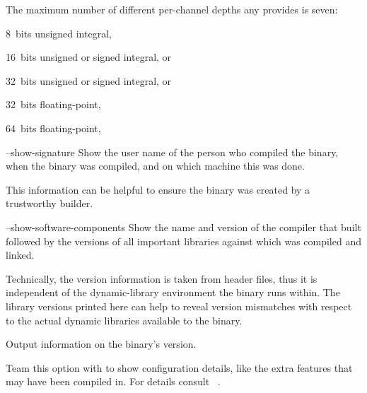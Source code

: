 \begin{codelist}
  The maximum number of different per-channel depths any \appcmd{} provides is seven:
  \begin{compactitemize}
  \item 8~bits unsigned integral, 
  \item 16~bits unsigned or signed integral,  or 
  \item 32~bits unsigned or signed integral,  or 
  \item 32~bits floating-point, 
  \item 64~bits floating-point, 
  \end{compactitemize}


  \label{opt:show-signature}%
\item[--show-signature]\itemend
  Show the user name of the person who compiled the binary, when the binary was compiled, and on
  which machine this was done.

  This information can be helpful to ensure the binary was created by a trustworthy builder.


  \label{opt:show-software-components}%
\item[--show-software-components]\itemend
  Show the name and version of the compiler that built \App{} followed by the versions of all
  important libraries against which \App{} was compiled and linked.

  Technically, the version information is taken from header files, thus it is independent of the
  dynamic-library environment the binary runs within.  The library versions printed here can
  help to reveal version mismatches with respect to the actual dynamic libraries available to
  the binary.


  \label{opt:version}%
\item[\itempar{-V \\ --version}]\itemend
  Output information on the binary's version.

  Team this option with  to show configuration
  details, like the extra features that may have been compiled in.  For details consult
  \sectionName~.
\end{codelist}



